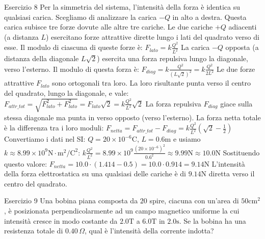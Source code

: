 \documentclass[a4paper]{article}
\begin{document}
\begin{snippetsolution}{Esercizio 8}
    Per la simmetria del sistema, l'intensità della forza è identica su qualsiasi carica. Scegliamo di analizzare la carica \(-Q\) in alto a destra. Questa carica subisce tre forze dovute alle altre tre cariche.
    Le due cariche \(+Q\) adiacenti (a distanza \(L\)) esercitano forze attrattive dirette lungo i lati del quadrato verso di esse. Il modulo di ciascuna di queste forze è:
    \(F_{lato} = k \frac{Q^2}{L^2}\)
    La carica \(-Q\) opposta (a distanza della diagonale \(L\sqrt{2}\)) esercita una forza repulsiva lungo la diagonale, verso l'esterno. Il modulo di questa forza è:
    \(F_{diag} = k \frac{Q^2}{(L\sqrt{2})^2} = k \frac{Q^2}{2L^2}\)
    Le due forze attrattive \(F_{lato}\) sono ortogonali tra loro. La loro risultante punta verso il centro del quadrato, lungo la diagonale, e vale:
    \(F_{attr\_tot} = \sqrt{F_{lato}^2 + F_{lato}^2} = F_{lato}\sqrt{2} = k \frac{Q^2}{L^2}\sqrt{2}\)
    La forza repulsiva \(F_{diag}\) giace sulla stessa diagonale ma punta in verso opposto (verso l'esterno). La forza netta totale è la differenza tra i loro moduli:
    \(F_{netta} = F_{attr\_tot} - F_{diag} = k \frac{Q^2}{L^2}\left(\sqrt{2} - \frac{1}{2}\right)\)
    Convertiamo i dati nel SI: \(Q = 20 \times 10^{-6} \mathrm{C}\), \(L = 0.6 \mathrm{m}\) e usiamo \(k \approx 8.99 \times 10^9 \mathrm{N \cdot m^2/C^2}\):
    \(k \frac{Q^2}{L^2} = 8.99 \times 10^9 \frac{(20 \times 10^{-6})^2}{0.6^2} \approx 9.99 \mathrm{N} \approx 10.0 \mathrm{N}\)
    Sostituendo questo valore:
    \(F_{netta} = 10.0 \cdot (1.414 - 0.5) = 10.0 \cdot 0.914 = 9.14 \mathrm{N}\)
    L'intensità della forza elettrostatica su una qualsiasi delle cariche è di \(9.14 \mathrm{N}\) diretta verso il centro del quadrato.
\end{snippetsolution}
\begin{snippetexercise}{Esercizio 9}
    Una bobina piana composta da \(20\) spire, ciacuna con un'area di
    \(50 \mathrm{cm^2}\), è posizionata perpendicolarmente ad un campo magnetico
    uniforme la cui intensità cresce in modo costante da \(2.0 \mathrm T\) a
    \(6.0 \mathrm T\) in \(2.0 \mathrm s\).
    Se la bobina ha una resistenza totale di \(0.40\,\Omega\), qual è l'intensità
    della corrente indotta?
\end{snippetexercise}
\end{document}
